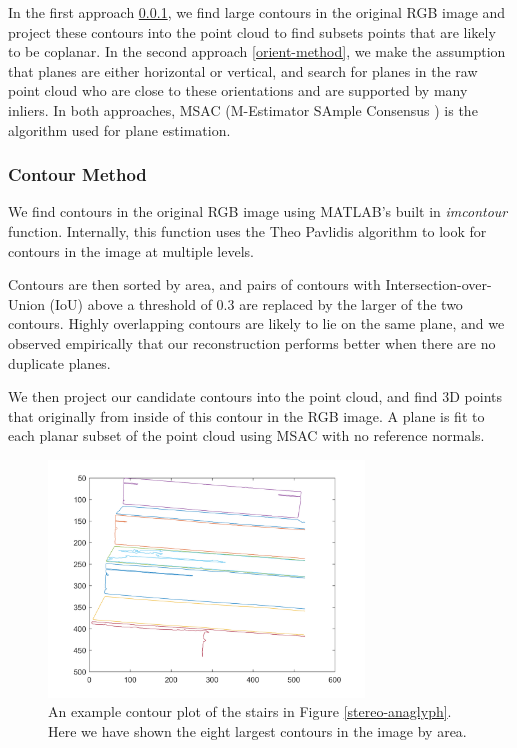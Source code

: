 In the first approach \ref{contour-method}, we find large contours in the original RGB image and project these contours into the point cloud to find subsets points that are likely to be coplanar. In the second approach \ref{orient-method}, we make the assumption that planes are either horizontal or vertical, and search for planes in the raw point cloud who are close to these orientations and are supported by many inliers. In both approaches, MSAC (M-Estimator SAmple Consensus \cite{msac-article}) is the algorithm used for plane estimation.

\subsubsection{Contour Method} \label{contour-method}

We find contours in the original RGB image using MATLAB's built in \textit{imcontour} function. Internally, this function uses the Theo Pavlidis algorithm \cite{pavlidis} to look for contours in the image at multiple levels.

Contours are then sorted by area, and pairs of contours with Intersection-over-Union (IoU) above a threshold of 0.3 are replaced by the larger of the two contours. Highly overlapping contours are likely to lie on the same plane, and we observed empirically that our reconstruction performs better when there are no duplicate planes.

We then project our candidate contours into the point cloud, and find 3D points that originally from inside of this contour in the RGB image. A plane is fit to each planar subset of the point cloud using MSAC with no reference normals.

\begin{figure}[!h]
\centering
\includegraphics[width=3.3in]{Sections/Figures/good_contour_plot_12-7.png}
\caption{An example contour plot of the stairs in Figure \ref{stereo-anaglyph}. Here we have shown the eight largest contours in the image by area.}
\label{contours-example}
\end{figure}

